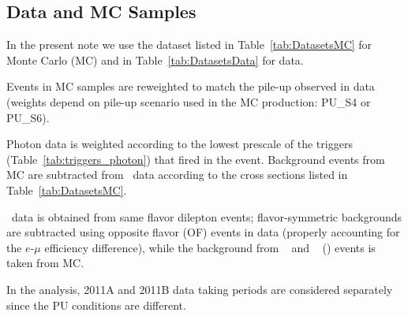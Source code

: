\subsection{Data and MC Samples}

In the present note we use the dataset listed in Table~\ref{tab:DatasetsMC} for Monte Carlo (MC) and in Table~\ref{tab:DatasetsData} for data.

Events in MC samples are reweighted to match the pile-up observed in data 
(weights depend on pile-up scenario used in the MC production: PU\_S4 or PU\_S6).

Photon data is weighted according to the lowest prescale of the triggers (Table~\ref{tab:triggers_photon}) that fired in the event.
Background events from MC are subtracted from \gjets~data according to the cross sections listed in Table~\ref{tab:DatasetsMC}.

\dyll~data is obtained from same flavor dilepton events; flavor-symmetric backgrounds are subtracted using opposite flavor (OF) events in data 
(properly accounting for the $e$-$\mu$ efficiency difference), while the background from \W\Z~ and \Z\Z~ (\V\Z) events is taken from MC.

In the analysis, 2011A and 2011B data taking periods are considered separately since the PU conditions are different.

